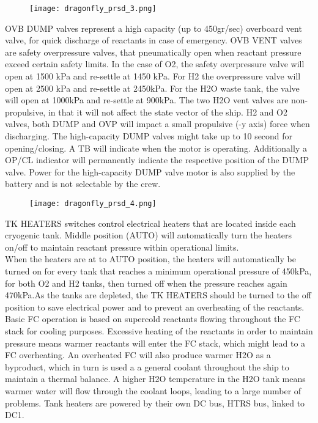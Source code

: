 \documentclass[Orbiter User Manual.tex]{subfiles}
\begin{document}
\begin{figure}[H]
  \centering
  \texttt{[image: dragonfly\_prsd\_3.png]}
\end{figure}

\noindent
OVB DUMP valves represent a high capacity (up to 450gr/sec) overboard vent valve, for quick discharge of reactants in case of emergency. OVB VENT valves are safety overpressure valves, that pneumatically open when reactant pressure exceed certain safety limits. In the case of O2, the safety overpressure valve will open at 1500 kPa and re-settle at 1450 kPa. For H2 the overpressure valve will open at 2500 kPa and re-settle at 2450kPa. For the H2O waste tank, the valve will open at 1000kPa and re-settle at 900kPa. The two H2O vent valves are non-propulsive, in that it will not affect the state vector of the ship. H2 and O2 valves, both DUMP and OVP will impact a small propulsive (-y axis) force when discharging. The high-capacity DUMP valves might take up to 10 second for opening/closing. A TB will indicate when the motor is operating. Additionally a OP/CL indicator will permanently indicate the respective position of the DUMP valve. Power for the high-capacity DUMP valve motor is also supplied by the battery and is not selectable by the crew.

\begin{figure}[H]
  \centering
  \texttt{[image: dragonfly\_prsd\_4.png]}
\end{figure}

\noindent
TK HEATERS switches control electrical heaters that are located inside each cryogenic tank. Middle position (AUTO) will automatically turn the heaters on/off to maintain reactant pressure within operational limits.\\
When the heaters are at to AUTO position, the heaters will automatically be turned on for every tank that reaches a minimum operational pressure of 450kPa, for both O2 and H2 tanks, then turned off when the pressure reaches again 470kPa.As the tanks are depleted, the TK HEATERS should be turned to the off position to save electrical power and to prevent an overheating of the reactants. Basic FC operation is based on supercold reactants flowing throughout the FC stack for cooling purposes. Excessive heating of the reactants in order to maintain pressure means warmer reactants will enter the FC stack, which might lead to a FC overheating. An overheated FC will also produce warmer H2O as a byproduct, which in turn is used a a general coolant throughout the ship to maintain a thermal balance. A higher H2O temperature in the H2O tank means warmer water will flow through the coolant loops, leading to a large number of problems. Tank heaters are powered by their own DC bus, HTRS bus, linked to DC1.
\end{document}
